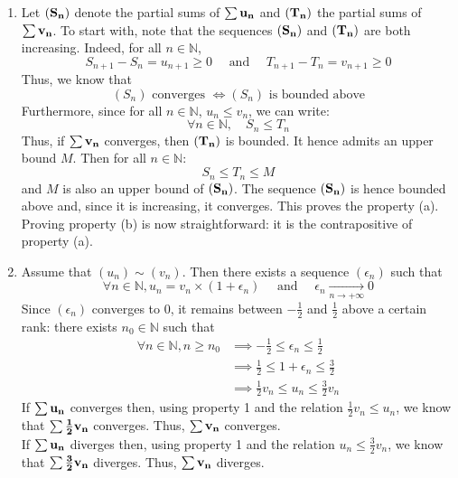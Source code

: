 \documentclass[notitlepage]{math}
\begin{document}
\begin{enumerate}
    \item Let $\bf (S_n)$ denote the partial sums of $\bf \sum u_n$ and $\bf (T_n)$ the partial sums of $\bf \sum v_n$.
    To start with, note that the sequences $\bf (S_n)$ and $\bf (T_n)$ are both increasing. Indeed, for all $n \in \mathbb{N}$,
    \[ S_{n+1} - S_n = u_{n+1} \geq 0 \quad \text{ and } \quad T_{n+1} - T_n = v_{n+1} \geq 0 \]
    Thus, we know that
    \[ (S_n) \text{ converges } \Longleftrightarrow (S_n) \text{ is bounded above} \]
    Furthermore, since for all $n \in \mathbb{N}$, $u_n \leq v_n$, we can write:
    \[ \forall n \in \mathbb{N}, \quad S_n \leq T_n \]
    Thus, if $\bf \sum v_n$ converges, then $\bf (T_n)$ is bounded.  It hence admits an upper bound $M$. Then for all $n \in \mathbb{N}$:
    \[ S_n \leq T_n \leq M \]
    and $M$ is also an upper bound of $\bf (S_n)$. The sequence $\bf (S_n)$ is hence bounded above and, since it is increasing, it converges. This proves the property (a).\\[1em]
    Proving property (b) is now straightforward: it is the contrapositive of property (a).

    \item Assume that $(u_n) \sim (v_n)$. Then there exists a sequence $(\epsilon_n)$ such that
    \[ \forall n \in \mathbb{N}, u_n = v_n \times (1 + \epsilon_n) \quad \text{ and } \quad \epsilon_n \xrightarrow[n \to +\infty]{} 0 \]
    Since $(\epsilon_n)$ converges to $0$, it remains between $-\frac{1}{2}$ and $\frac{1}{2}$ above a certain rank: there exists $n_0 \in \mathbb{N}$ such that
    \begin{align*}
        \forall n \in \mathbb{N}, n \geq n_0 &\implies -\frac{1}{2} \leq \epsilon_n \leq \frac{1}{2}\\
        &\implies \frac{1}{2} \leq 1 + \epsilon_n \leq \frac{3}{2}\\
        &\implies \frac{1}{2} v_n \leq u_n \leq \frac{3}{2} v_n
    \end{align*}
    If $\bf \sum u_n$ converges then, using property 1 and the relation $\frac{1}{2} v_n \leq u_n$, we know that $\bf \sum \frac{1}{2} v_n$ converges.
    Thus, $\bf \sum v_n$ converges.\\[1em]

    If $\bf \sum u_n$ diverges then, using property 1 and the relation $u_n \leq \frac{3}{2} v_n$, we know that $\bf \sum \frac{3}{2} v_n$ diverges.
    Thus, $\bf \sum v_n$ diverges.    
\end{enumerate}

\end{document}
